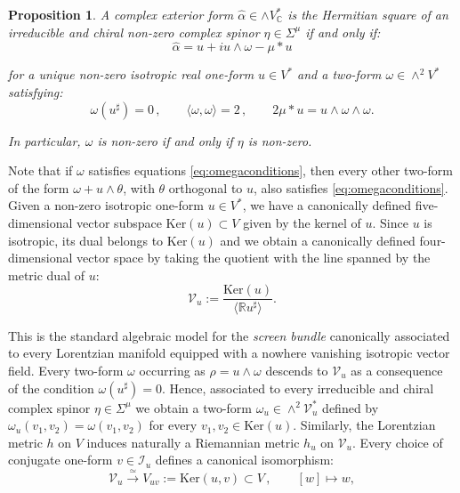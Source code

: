 \documentclass[10pt,a4paper,twoside,reqno]{amsart}
\theoremstyle{plain}
\newtheorem{prop}[thm]{Proposition}
\theoremstyle{definition}
\theoremstyle{remark}
\def\cI{\mathcal{I}}
\def\cV{\mathcal{V}}
\newcommand{\escal}[1]{\langle#1\rangle}
\begin{document}
\begin{prop}
\label{prop:HermitiansquareLorentz6d}
A complex exterior form $\widehat{\alpha} \in \wedge V^{\ast}_{\mathbb{C}}$ is the Hermitian square of an irreducible and chiral non-zero complex spinor $\eta\in\Sigma^\mu$ if and only if:
\begin{equation*}
\widehat{\alpha} = u + i u\wedge \omega - \mu \ast u
\end{equation*}

\noindent
for a unique non-zero isotropic real one-form $u\in V^{\ast}$ and a two-form $\omega\in \wedge^{2} V^{\ast}$ satisfying:
\begin{equation}
\label{eq:omegaconditions}
\omega(u^\sharp) = 0\, , \qquad \escal{\omega,\omega}=2 \, , \qquad 2\mu \ast u = u\wedge \omega \wedge \omega.
\end{equation}

\noindent
In particular, $\omega$ is non-zero if and only if $\eta$ is non-zero. 
\end{prop}

\noindent
Note that if $\omega$ satisfies equations \eqref{eq:omegaconditions}, then every other two-form of the form $\omega + u\wedge \theta$, with $\theta$ orthogonal to $u$, also satisfies \eqref{eq:omegaconditions}. Given a non-zero isotropic one-form $u\in V^{\ast}$, we have a canonically defined five-dimensional vector subspace $\mathrm{Ker}(u) \subset V$ given by the kernel of $u$. Since $u$ is isotropic, its dual belongs to $\mathrm{Ker}(u)$ and we obtain a canonically defined four-dimensional vector space by taking the quotient with the line spanned by the metric dual of $u$:
\begin{equation*}
\cV_u := \frac{\mathrm{Ker}(u)}{\langle \mathbb{R} u^\sharp\rangle}.
\end{equation*}

\noindent
This is the standard algebraic model for the \emph{screen bundle} canonically associated to every Lorentzian manifold equipped with a nowhere vanishing isotropic vector field. Every two-form $\omega$ occurring as $\rho = u\wedge \omega$ descends to $\cV_u$ as a consequence of the condition $\omega (u^\sharp) = 0$. Hence, associated to every irreducible and chiral complex spinor $\eta\in \Sigma^{\mu}$ we obtain a two-form $\omega_u \in \wedge^2 \cV_u^{\ast}$ defined by $\omega_u(v_1 , v_2) = \omega(v_1,v_2)$ for every $v_1 , v_2 \in \mathrm{Ker}(u)$. Similarly, the Lorentzian metric $h$ on $V$ induces naturally a Riemannian metric $h_u$ on $\cV_u$. Every choice of conjugate one-form $v\in \cI_u$ defines a canonical isomorphism:
\begin{equation*}
\cV_u \xrightarrow{\simeq} V_{uv} := \mathrm{Ker}(u,v) \subset V \, , \qquad [w] \mapsto w,
\end{equation*}
\end{document}
